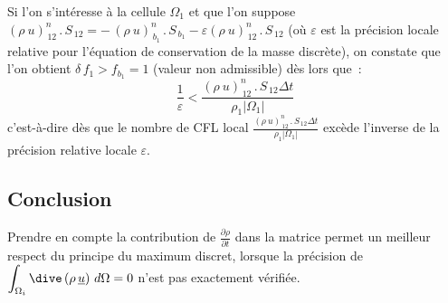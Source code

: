 Si l'on s'intéresse à la cellule $\Omega_1$ et que l'on
suppose $(\rho\ u)^n_{\,12}\,.\,S_{\,12}=-\,(\rho\
u)^n_{\,b_1}\,.\,S_{\,b_1}-\varepsilon (\rho\ u)^n_{\,12}\,.\,S_{\,12}$ (où
$\varepsilon$ est la précision locale relative pour l'équation de
conservation de la masse discrète), on constate que l'on obtient $\delta\,f_1
> f_{b_1} = 1 $ (valeur non admissible) dès lors que~:
 $$\frac{1}{\varepsilon} < \frac{(\rho\
u)^n_{\,12}\,.\,S_{\,12}\Delta t}{\rho_1|\Omega_1|}$$
c'est-à-dire dès que
le nombre de CFL local $\displaystyle\frac{(\rho\
u)^n_{\,12}\,.\,S_{\,12}\Delta t}{\rho_1|\Omega_1|}$ excède l'inverse de la
précision relative locale $\varepsilon$.

\subsection*{Conclusion}

Prendre en compte la contribution de
$\displaystyle\frac{\partial \rho}{\partial t}$ dans la matrice permet un meilleur respect du principe du maximum discret, lorsque la
précision de $\displaystyle\int_{\Omega_i}\dive\,(\rho\,\underline{u})\
d\Omega = 0$ n'est pas exactement vérifiée.
